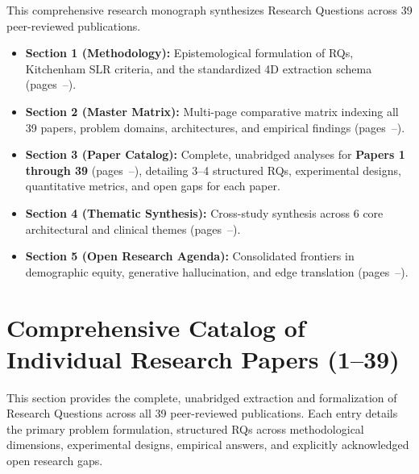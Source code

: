 \documentclass[11pt,a4paper]{article}
\begin{document}


\thispagestyle{plain}
\setcounter{tocdepth}{1}
\tableofcontents
\vspace{2.5em}
\begin{tcolorbox}[colback=blue!5!white,colframe=blue!75!black,title=\textbf{Monograph Structure \& Navigation Guide}]
\small
This comprehensive research monograph synthesizes Research Questions across 39 peer-reviewed publications.
\begin{itemize}[leftmargin=1.5em, itemsep=0.4em]
    \item \textbf{Section 1 (Methodology):} Epistemological formulation of RQs, Kitchenham SLR criteria, and the standardized 4D extraction schema (pages~\pageref{sec:methodology}--\pageref{sec:matrix}).
    \item \textbf{Section 2 (Master Matrix):} Multi-page comparative matrix indexing all 39 papers, problem domains, architectures, and empirical findings (pages~\pageref{sec:matrix}--\pageref{sec:papers_catalog}).
    \item \textbf{Section 3 (Paper Catalog):} Complete, unabridged analyses for \textbf{Papers 1 through 39} (pages~\pageref{sec:papers_catalog}--\pageref{sec:thematic_synthesis}), detailing 3--4 structured RQs, experimental designs, quantitative metrics, and open gaps for each paper.
    \item \textbf{Section 4 (Thematic Synthesis):} Cross-study synthesis across 6 core architectural and clinical themes (pages~\pageref{sec:thematic_synthesis}--\pageref{sec:open_rqs}).
    \item \textbf{Section 5 (Open Research Agenda):} Consolidated frontiers in demographic equity, generative hallucination, and edge translation (pages~\pageref{sec:open_rqs}--\pageref{sec:references}).
\end{itemize}
\end{tcolorbox}
\newpage


\newpage


\newpage

\section{Comprehensive Catalog of Individual Research Papers (1--39)}
\label{sec:papers_catalog}
This section provides the complete, unabridged extraction and formalization of Research Questions across all 39 peer-reviewed publications. Each entry details the primary problem formulation, structured RQs across methodological dimensions, experimental designs, empirical answers, and explicitly acknowledged open research gaps.
\vspace{1em}
\end{document}
